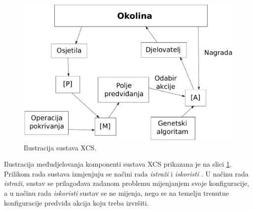 \documentclass[times, utf8, zavrsni]{fer}
\begin{document}
\begin{figure}[h]
    \centering
    \includegraphics[width=\textwidth]{img/xcs.pdf}
    \caption{Ilustracija sustava XCS.}
    \label{img:xcs}
\end{figure}
Ilustracija međudjelovanja komponenti sustava XCS prikazana je na slici \ref{img:xcs}.
Prilikom rada sustava izmjenjuju se načini rada \emph{istraži}  i \emph{iskoristi} .
U načinu rada \emph{istraži}, sustav se prilagođava zadanom problemu mijenjanjem svoje konfiguracije, a u načinu rada \emph{iskoristi} sustav se ne mijenja, nego se na temelju trenutne konfiguracije predviđa akcija koju treba izvršiti.
\end{document}
